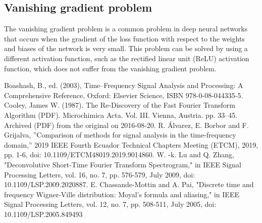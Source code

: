 \documentclass[a4paper]{sapthesis}
\begin{document}
\subsection{Vanishing gradient problem}\label{sec:vanishing_gradient}
The vanishing gradient problem is a common problem in deep neural networks
 that occurs when the gradient of the loss function with respect to the
  weights and biases of the network is very small. This problem can be 
  solved by using a different activation function, such as the rectified 
  linear unit (ReLU) activation function, which does not suffer from the 
  vanishing gradient problem.
\begin{thebibliography}{1}
     {Boashash, B., ed. (2003), Time–Frequency Signal Analysis and Processing: A Comprehensive Reference, Oxford: Elsevier Science, ISBN 978-0-08-044335-5.}
     {Cooley, James W. (1987). The Re-Discovery of the Fast Fourier Transform Algorithm (PDF). Microchimica Acta. Vol. III. Vienna, Austria. pp. 33–45. Archived (PDF) from the original on 2016-08-20.}
     {R. Álvarez, E. Borbor and F. Grijalva, ''Comparison of methods for signal analysis in the time-frequency domain,'' 2019 IEEE Fourth Ecuador Technical Chapters Meeting (ETCM), 2019, pp. 1-6, doi: 10.1109/ETCM48019.2019.9014860.}
     {W. -k. Lu and Q. Zhang, "Deconvolutive Short-Time Fourier Transform Spectrogram," in IEEE Signal Processing Letters, vol. 16, no. 7, pp. 576-579, July 2009, doi: 10.1109/LSP.2009.2020887.}
     {E. Chassande-Mottin and A. Pai, "Discrete time and frequency Wigner-Ville distribution: Moyal's formula and aliasing," in IEEE Signal Processing Letters, vol. 12, no. 7, pp. 508-511, July 2005, doi: 10.1109/LSP.2005.849493}

\end{thebibliography}
\end{document}
